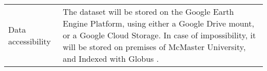 \documentclass[times,final]{elsarticle.cls}
\begin{document}
{\begin{longtable}{|p{33mm}|p{94mm}|}
\hline                         
\hypertarget{target1}
{Data accessibility}   & The dataset will be stored on the Google Earth Engine 
                        Platform\cite{5}, using either a Google Drive mount, or a Google Cloud Storage.
                        \newline \newline
                        In case of impossibility, it will be stored on premises of McMaster University, and Indexed with Globus \cite{6}.\\








\end{longtable}}
\end{document}
